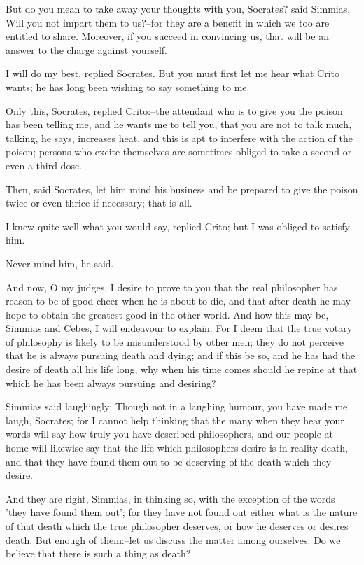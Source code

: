 But do you mean to take away your thoughts with you, Socrates? said
Simmias. Will you not impart them to us?--for they are a benefit
in which we too are entitled to share. Moreover, if you succeed in
convincing us, that will be an answer to the charge against yourself.

I will do my best, replied Socrates. But you must first let me hear what
Crito wants; he has long been wishing to say something to me.

Only this, Socrates, replied Crito:--the attendant who is to give you
the poison has been telling me, and he wants me to tell you, that you
are not to talk much, talking, he says, increases heat, and this is
apt to interfere with the action of the poison; persons who excite
themselves are sometimes obliged to take a second or even a third dose.

Then, said Socrates, let him mind his business and be prepared to give
the poison twice or even thrice if necessary; that is all.

I knew quite well what you would say, replied Crito; but I was obliged
to satisfy him.

Never mind him, he said.

And now, O my judges, I desire to prove to you that the real philosopher
has reason to be of good cheer when he is about to die, and that after
death he may hope to obtain the greatest good in the other world. And
how this may be, Simmias and Cebes, I will endeavour to explain. For I
deem that the true votary of philosophy is likely to be misunderstood
by other men; they do not perceive that he is always pursuing death and
dying; and if this be so, and he has had the desire of death all his
life long, why when his time comes should he repine at that which he has
been always pursuing and desiring?

Simmias said laughingly: Though not in a laughing humour, you have made
me laugh, Socrates; for I cannot help thinking that the many when they
hear your words will say how truly you have described philosophers, and
our people at home will likewise say that the life which philosophers
desire is in reality death, and that they have found them out to be
deserving of the death which they desire.

And they are right, Simmias, in thinking so, with the exception of the
words 'they have found them out'; for they have not found out either
what is the nature of that death which the true philosopher deserves,
or how he deserves or desires death. But enough of them:--let us discuss
the matter among ourselves: Do we believe that there is such a thing as
death?

